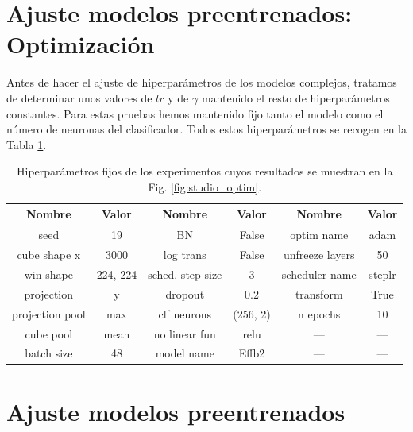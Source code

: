 \documentclass[a4paper,12pt,oneside,titlepage]{book}
\begin{document}
\begin{appendices}
  \section{Ajuste modelos preentrenados: Optimización}
  \label{an:6}

  Antes de hacer el ajuste de hiperparámetros de los modelos complejos, tratamos de determinar unos valores de $lr$ y de $\gamma$ mantenido el resto de hiperparámetros constantes. Para estas pruebas hemos mantenido fijo tanto el modelo como el número de neuronas del clasificador. Todos estos hiperparámetros se recogen en la Tabla \ref{tab:anexo_pre_optim}.

  \begin{table}[h!]
    \centering
    \begin{tabular}{|c|c||c|c||c|c|}
    \hline
    Nombre          & Valor    & Nombre           & Valor    & Nombre          & Valor  \\ \hline\hline
    seed            & 19       & BN               & False    & optim name      & adam   \\ \hline
    cube shape x    & 3000     & log trans        & False    & unfreeze layers & 50     \\ \hline
    win shape       & 224, 224 & sched. step size & 3        & scheduler name  & steplr \\ \hline
    projection      & y        & dropout          & 0.2      & transform       & True   \\ \hline
    projection pool & max      & clf neurons      & (256, 2) & n epochs        & 10     \\ \hline
    cube pool       & mean     & no linear fun    & relu     & ---             & ---    \\ \hline
    batch size      & 48       & model name       & Effb2    & ---             & ---    \\ \hline
    \end{tabular}
    \caption{Hiperparámetros fijos de los experimentos cuyos resultados se muestran en la Fig. \ref{fig:studio_optim}.}
    \label{tab:anexo_pre_optim}
  \end{table}

  \section{Ajuste modelos preentrenados}
  \label{an:7}


\end{appendices}
\end{document}
